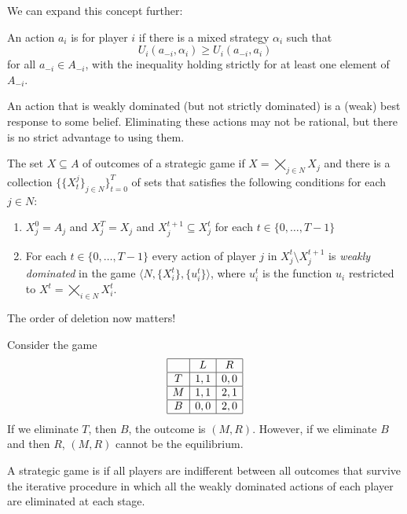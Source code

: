 \documentclass[10pt]{article}
\begin{document}
We can expand this concept further:

\begin{definition}
	An action $a_i$ is  for player $i$ if there is a mixed strategy $\alpha_i$ such that \[U_i(a_{-i},\alpha_i) \ge U_i(a_{-i},a_i)\]for all $a_{-i} \in A_{-i}$, with the inequality holding strictly for at least one element of $A_{-i}$.
\end{definition}

An action that is weakly dominated (but not strictly dominated) is a (weak) best response to some belief. Eliminating these actions may not be rational, but there is no strict advantage to using them. 

\begin{definition}
	The set $X \subseteq A$ of outcomes of a strategic game  if $X = \bigtimes_{j\in N}X_j$ and there is a collection $\{\{X_t^j\}_{j \in N}\}_{t=0}^T$ of sets that satisfies the following conditions for each $j \in N$:
	\begin{enumerate}
		\item $X_j^0 = A_j$ and $X^T_j = X_j$ and $X^{t+1}_j \subseteq X^t_j$ for each $t\in \{0,\dots,T-1\}$
		\item For each $t \in \{0,\dots,T-1\}$ every action of player $j$ in $X^t_j \setminus X^{t+1}_j$ is \emph{weakly dominated} in the game $\langle N,\{X_i^t\},\{u_i^t\}\rangle$, where $u^t_i$ is the function $u_i$ restricted to $X^t = \bigtimes_{i\in N}X_i^t$.
	\end{enumerate}
\end{definition}

\begin{remark}
	The order of deletion now matters! 
\end{remark}
\begin{example}
	Consider the game
	\[
	\begin{array}{|c|c|c|}
		\hline & L & R \\\hline
		T & 1,1 & 0,0 \\\hline
		M & 1,1 & 2,1 \\\hline
		B & 0,0 & 2,0 \\\hline
	\end{array}
	\]
	If we eliminate $T$, then $B$, the outcome is $(M,R)$. However, if we eliminate $B$ and then $R$, $(M,R)$ cannot be the equilibrium.
\end{example}

\begin{definition}
	A strategic game is  if all players are indifferent between all outcomes that survive the iterative procedure in which all the weakly dominated actions of each player are eliminated at each stage.
\end{definition}
\end{document}
